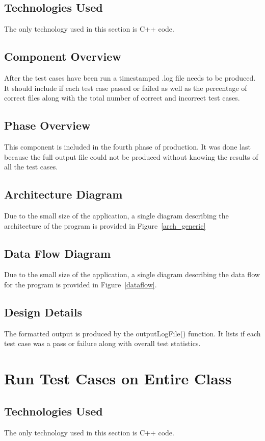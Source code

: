\subsection{Technologies  Used}
The only technology used in this section is C++ code.

\subsection{Component  Overview}
After the test cases have been run a timestamped .log file needs to be produced. It should include if each test case passed or failed as well as the percentage of correct files along with the total number of correct and incorrect test cases.

\subsection{Phase Overview}
This component is included in the fourth phase of production. It was done last because the full output file could not be produced without knowing the results of all the test cases.

\subsection{ Architecture  Diagram}
Due to the small size of the application, a single diagram describing the architecture of the program is provided in Figure~\ref{arch_generic}


\subsection{Data Flow Diagram}
Due to the small size of the application, a single diagram describing the data flow for the program is provided in Figure~\ref{dataflow}.

\subsection{Design Details}
The formatted output is produced by the outputLogFile() function. It lists if each test case was a pass or failure along with overall test statistics. 



\section{Run Test Cases on Entire Class}

\subsection{Technologies  Used}
The only technology used in this section is C++ code.

